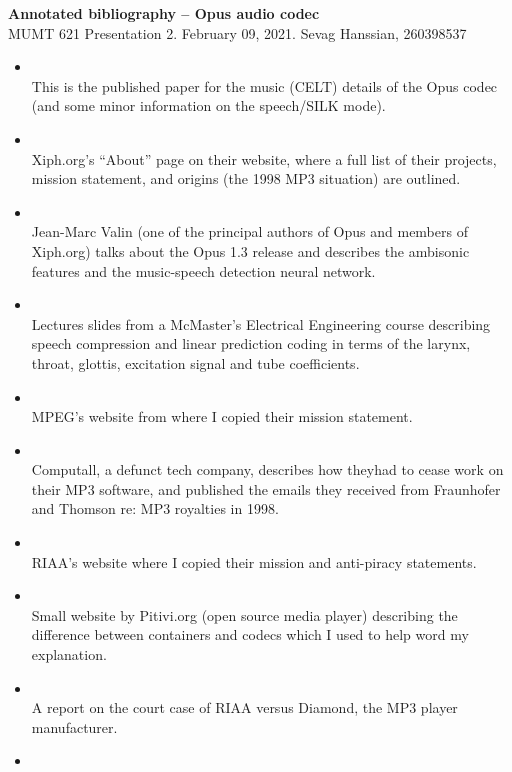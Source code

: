 \documentclass[letter,12pt]{report}
\begin{document}
\Large{\textbf{Annotated bibliography -- Opus audio codec}}\\
\large{MUMT 621 Presentation 2. February 09, 2021. Sevag Hanssian, 260398537}

\begin{itemize}
	\item
		\\
		This is the published paper for the music (CELT) details of the Opus codec (and some minor information on the speech/SILK mode).
	\item
		\\
		Xiph.org's ``About'' page on their website, where a full list of their projects, mission statement, and origins (the 1998 MP3 situation) are outlined.
	\item
		\\
		Jean-Marc Valin (one of the principal authors of Opus and members of Xiph.org) talks about the Opus 1.3 release and describes the ambisonic features and the music-speech detection neural network.
	\item
		\\
		Lectures slides from a McMaster's Electrical Engineering course describing speech compression and linear prediction coding in terms of the larynx, throat, glottis, excitation signal and tube coefficients.
	\item
		\\
		MPEG's website from where I copied their mission statement.
	\item
		\\
		Computall, a defunct tech company, describes how theyhad to cease work on their MP3 software, and published the emails they received from Fraunhofer and Thomson re: MP3 royalties in 1998.
	\item
		\\
		RIAA's website where I copied their mission and anti-piracy statements.
	\item
		\\
		Small website by Pitivi.org (open source media player) describing the difference between containers and codecs which I used to help word my explanation.
	\item
		\\
		A report on the court case of RIAA versus Diamond, the MP3 player manufacturer.
	\item
		\\

\end{itemize}
\end{document}
